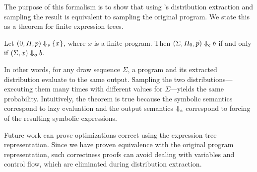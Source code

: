 \begin{mainonly}

The purpose of this formalism is to show that using \tool's distribution
extraction and sampling the result is equivalent to sampling the original
program.
We state this as a theorem for finite expression trees.

\begin{theorem}
Let $(0, H, p) \Downarrow_s \{ x \}$, where $x$ is a finite program.
Then $(\Sigma, H_0, p) \Downarrow_c b$ if and only if $(\Sigma, x) \Downarrow_o b$.
\end{theorem}

\noindent In other words, for any draw sequence $\Sigma$, a program and its
extracted distribution evaluate to the same output. Sampling the two
distributions---executing them many times with different values for
$\Sigma$---yields the same probability.
Intuitively, the theorem is true because the symbolic semantics correspond to 
lazy evaluation and the output semantics $\Downarrow_e$ correspond to
forcing of the resulting symbolic expressions.

Future work can prove optimizations correct using the expression
tree representation.
Since we have proven equivalence with the original program representation,
such correctness proofs can avoid dealing with variables and control flow,
which are eliminated during distribution extraction.

\end{mainonly}
